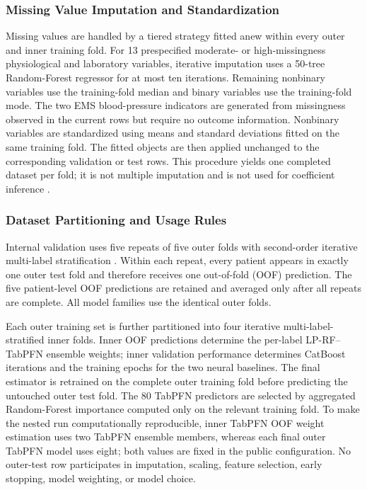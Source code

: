 \documentclass{ieeeaccess}
\begin{document}
\subsubsection{Missing Value Imputation and Standardization}

Missing values are handled by a tiered strategy fitted anew within every outer and inner training fold. For 13 prespecified moderate- or high-missingness physiological and laboratory variables, iterative imputation uses a 50-tree Random-Forest regressor for at most ten iterations. Remaining nonbinary variables use the training-fold median and binary variables use the training-fold mode. The two EMS blood-pressure indicators are generated from missingness observed in the current rows but require no outcome information. Nonbinary variables are standardized using means and standard deviations fitted on the same training fold. The fitted objects are then applied unchanged to the corresponding validation or test rows. This procedure yields one completed dataset per fold; it is not multiple imputation and is not used for coefficient inference \cite{stekhoven2012}.

\subsubsection{Dataset Partitioning and Usage Rules}

Internal validation uses five repeats of five outer folds with second-order iterative multi-label stratification \cite{sechidis2011}. Within each repeat, every patient appears in exactly one outer test fold and therefore receives one out-of-fold (OOF) prediction. The five patient-level OOF predictions are retained and averaged only after all repeats are complete. All model families use the identical outer folds.

Each outer training set is further partitioned into four iterative multi-label-stratified inner folds. Inner OOF predictions determine the per-label LP-RF--TabPFN ensemble weights; inner validation performance determines CatBoost iterations and the training epochs for the two neural baselines. The final estimator is retrained on the complete outer training fold before predicting the untouched outer test fold. The 80 TabPFN predictors are selected by aggregated Random-Forest importance computed only on the relevant training fold. To make the nested run computationally reproducible, inner TabPFN OOF weight estimation uses two TabPFN ensemble members, whereas each final outer TabPFN model uses eight; both values are fixed in the public configuration. No outer-test row participates in imputation, scaling, feature selection, early stopping, model weighting, or model choice.
\end{document}
